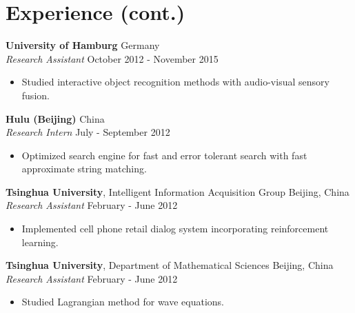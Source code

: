 \documentclass[a4paper,11pt]{article} %
\begin{document}

\pagebreak


\section*{Experience (cont.)}

\textbf{University of Hamburg} \hfill Germany \\
\textit{Research Assistant}  \hfill October 2012 - November 2015
\vspace{-.9\parskip}
\begin{itemize}
  \item Studied interactive object recognition methods with audio-visual sensory fusion.
\end{itemize}


\textbf{Hulu (Beijing)} \hfill China \\
\textit{Research Intern} \hfill July - September 2012
\vspace{-.9\parskip}
\begin{itemize}
  \item Optimized search engine for fast and error tolerant search with fast approximate string matching.
\end{itemize}


\iffalse

\textbf{Tsinghua University}, Intelligent Information Acquisition Group \hfill Beijing, China \\
\textit{Research Assistant} \hfill February - June 2012
\vspace{-\parskip}
\begin{itemize}
  \item Implemented cell phone retail dialog system incorporating reinforcement learning.
\end{itemize}


\textbf{Tsinghua University}, Department of Mathematical Sciences \hfill Beijing, China \\
\textit{Research Assistant} \hfill February - June 2012
\vspace{-\parskip}
\begin{itemize}
  \item Studied Lagrangian method for wave equations.
\end{itemize}
\end{document}
